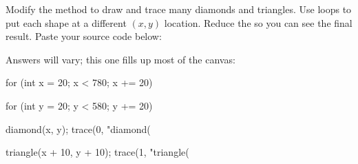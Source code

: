 \Q \label{key1}
Modify the  method to draw and trace many diamonds and triangles.
Use  loops to put each shape at a different $(x,y)$ location.
Reduce the  so you can see the final result.
Paste your source code below:

\begin{answer}[15em]
Answers will vary; this one fills up most of the canvas:
\vspace{1em}
\begin{javaans}
for (int x = 20; x < 780; x += 20) {
    for (int y = 20; y < 580; y += 20) {
        diamond(x, y);
        trace(0, "diamond(%

        triangle(x + 10, y + 10);
        trace(1, "triangle(%
    }
}
\end{javaans}
\end{answer}
